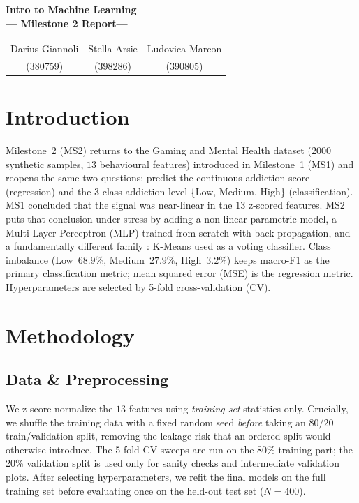 \documentclass[10pt,twocolumn,a4paper]{article}
\begin{document}
\begin{center}
{\Large\bfseries Intro to Machine Learning\\ --- Milestone 2 Report---}\\[0.6em]
{\footnotesize
\begin{tabular}{c c c}
Darius Giannoli & Stella Arsie & Ludovica Marcon \\
(380759) & (398286) & (390805)
\end{tabular}}
\end{center}

\section{Introduction}

Milestone~2 (MS2) returns to the Gaming and Mental Health dataset
($2000$ synthetic samples, $13$ behavioural features) introduced in
Milestone~1 (MS1) and reopens the same two questions: predict the
continuous addiction score (regression) and the 3-class addiction level
\{Low, Medium, High\} (classification). MS1 concluded that the signal
was near-linear in the $13$ z-scored features. MS2 puts that conclusion
under stress by adding a non-linear parametric model, a
Multi-Layer Perceptron (MLP) trained from scratch with
back-propagation, and a fundamentally different family :
K-Means used as a voting classifier. Class imbalance (Low~$68.9\%$,
Medium~$27.9\%$, High~$3.2\%$) keeps macro-F1 as the primary
classification metric; mean squared error (MSE) is the regression
metric. Hyperparameters are selected by 5-fold cross-validation (CV).

\section{Methodology}
\subsection{Data \& Preprocessing}
We z-score normalize the $13$ features using \emph{training-set}
statistics only. Crucially, we shuffle the training data with a fixed
random seed \emph{before} taking an $80/20$ train/validation split,
removing the leakage risk that an ordered split would otherwise
introduce. The 5-fold CV sweeps are run on the 80\% training part; the
20\% validation split is used only for sanity checks and intermediate
validation plots. After selecting hyperparameters, we refit the final
models on the full training set before evaluating once on the held-out
test set ($N{=}400$).
\end{document}
